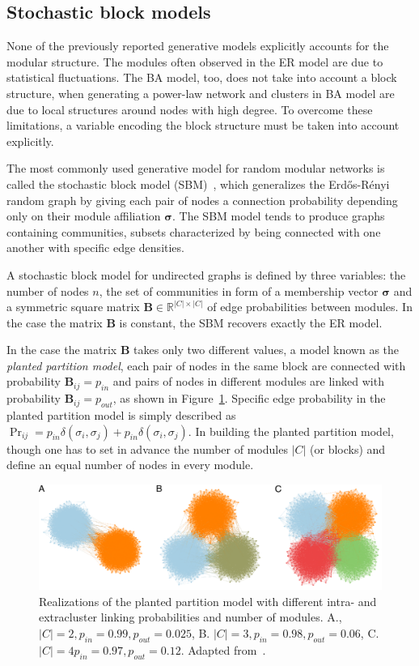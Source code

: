 \subsection{Stochastic block models}
None of the previously reported generative models explicitly accounts for the modular structure.
The modules often observed in the ER model are due to statistical fluctuations.
The BA model, too, does not take into account a block structure, when generating a power-law network and clusters in BA model are due to local structures around nodes with high degree.
To overcome these limitations, a variable encoding the block structure must be taken into account explicitly.

The most commonly used generative model for random modular networks is called the stochastic block model (SBM)~\cite{holland1983}, which generalizes the Erd\H{o}s-Rényi random graph by giving each pair of nodes a connection probability depending only on their module affiliation $\boldsymbol \sigma$.
The SBM model tends to produce graphs containing communities, subsets characterized by being connected with one another with specific edge densities.

A stochastic block model for undirected graphs is defined by three variables: the number of nodes $n$, the set of communities in form of a membership vector $\boldsymbol \sigma$ and a symmetric square matrix  $\mathbf{B} \in \mathbb{R}^{|C| \times |C|}$ of edge probabilities between modules.
In the case the matrix $\mathbf{B}$ is constant, the SBM recovers exactly the ER model.

In the case the matrix $\mathbf{B}$ takes only two different values, a model known as the \emph{planted partition model}, each pair of nodes in the same block are connected with probability $\mathbf{B}_{ij}=p_{in}$ and pairs of nodes in different modules are linked with probability $\mathbf{B}_{ij}=p_{out}$, as shown in Figure~\ref{fig:planted_peixoto}.
Specific edge probability in the planted partition model is simply described as $\Pr_{ij} = p_{in}\delta(\sigma_i,\sigma_j) + p_{in}\delta(\sigma_i,\sigma_j)$.
In building the planted partition model, though one has to set in advance the number of modules $|C|$ (or blocks) and define an equal number of nodes in every module.

\begin{figure}[htb!]
\centering
\includegraphics[width=1.0\textwidth]{images/peixoto_block_models.pdf}
\caption{Realizations of the planted partition model with different intra- and extracluster linking probabilities and number of modules.
A., $|C|=2, p_{in}=0.99, p_{out}=0.025$, B.
$|C|=3, p_{in}=0.98, p_{out}=0.06$, C.
$|C|=4 p_{in}=0.97, p_{out}=0.12$.
Adapted from~\cite{peixoto2015}.}
\label{fig:planted_peixoto}
\end{figure}

